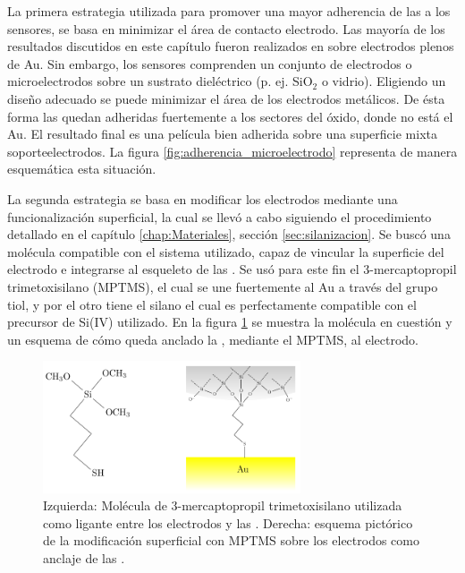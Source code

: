 			 La primera estrategia utilizada para promover una mayor adherencia de las \pdm\space a los sensores, se basa en minimizar el área de contacto electrodo\textbar\pdm. Las mayoría de los resultados discutidos en este capítulo fueron realizados en \pdm\space sobre electrodos plenos de Au. Sin embargo, los sensores comprenden un conjunto de electrodos o microelectrodos sobre un sustrato dieléctrico (p. ej. SiO$_2$ o vidrio). Eligiendo un diseño adecuado se puede minimizar el área de los electrodos metálicos. De ésta forma las \pdm\space quedan adheridas fuertemente a los sectores del óxido, donde no está el Au. El resultado final es una película bien adherida sobre una superficie mixta soporte\textbar electrodos.  La figura \ref{fig:adherencia_microelectrodo} representa de manera esquemática esta situación.
					
			 La segunda estrategia se basa en modificar los electrodos mediante una funcionalización superficial, la cual se llevó a cabo siguiendo el procedimiento detallado en el capítulo \ref{chap:Materiales}, sección \ref{sec:silanizacion}. Se buscó una molécula compatible con el sistema utilizado, capaz de vincular la superficie del electrodo e integrarse al esqueleto de las \pdm. Se usó para este fin el 3-mercaptopropil trimetoxisilano (MPTMS), el cual se une fuertemente al Au a través del grupo tiol\cite{Gosser,Byun2013}, y por el otro tiene el silano el cual es perfectamente compatible con el precursor de Si(IV) utilizado\cite{Wu2014,Wu2013,Chen2011}. En la figura \ref{fig:mod_sup} se muestra la molécula en cuestión y un esquema de cómo queda anclado la \pdm, mediante el MPTMS, al electrodo.

			 \begin{figure}[!h]
							\begin{center}
							\includegraphics[width=0.68\textwidth]{Esquemas/mod_sup.pdf}
							\caption[Modificación superficial de los electrodos.]{Izquierda: Molécula de  3-mercaptopropil trimetoxisilano utilizada como ligante entre los electrodos y las \pdm. Derecha: esquema pictórico de la modificación superficial con MPTMS sobre los electrodos como anclaje de las \pdm.}
							\label{fig:mod_sup}
							\end{center}
							\end{figure}
		
